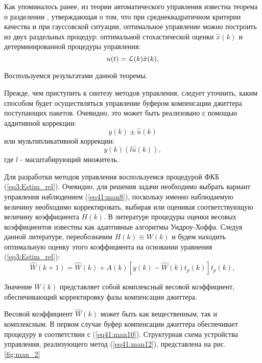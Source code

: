 Как упоминалось ранее, из теории автоматического управления известна теорема о разделении \cite{seij, red}, утверждающая о том, что при среднеквадратичном критерии качества и
при гауссовской ситуации, оптимальное управление можно построить из двух раздельных процедур: оптимальной стохастической оценки $\hat x (k)$  и детерминированной процедуры управления:
\begin{equation}\label{eq41:man9}
u(t)=\EuScript{L}(k)\hat x (k),
\end{equation}

Воспользуемся результатами данной теоремы.

Прежде, чем приступить к синтезу методов управления, следует уточнить, каким способом будет осуществляться управление буфером компенсации джиттера поступающих пакетов. 
Очевидно, это может быть реализовано с помощью аддитивной коррекции:
\begin{equation}\label{eq41:man10}
y(k)\pm\hat u(k)
\end{equation}
или мультипликативной коррекции:
\begin{equation}\label{eq41:man11}
y(k)(l\hat u(k)),
\end{equation}
\noindent где $l$ - масштабирующий множитель.

Для разработки методов управления воспользуемся процедурой ФКБ (\ref{eq3:Estim_rel}). Очевидно, для решения задачи необходимо выбрать вариант управления наблюдением (\ref{eq41:man8}),
поскольку именно наблюдаемую величину необходимо корректировать, выбирая или оценивая соответствующую величину коэффициента $H(k)$. 
В литературе \cite{windrow,monzigo} процедуры оценки весовых коэффициентов известны как адаптивные алгоритмы Уидроу-Хоффа. 
Следуя данной литературе, переобозначим $H(k)\equiv W(k)$ и будем находить оптимальную оценку этого коэффициента на основании уравнения (\ref{eq3:Estim_rel}):
\begin{equation}\label{eq41:man12}
\hat W(k+1)=\hat W(k)+A(k)[y(k)-\hat W(k)t_{p}(k)]t_{p}(k),
\end{equation}

Значение $W(k)$ представляет собой комплексный весовой коэффициент, обеспечивающий корректировку фазы компенсации джиттера.

Весовой коэффициент $\hat W(k)$ может быть как вещественным, так и комплексным. 
В первом случае буфер компенсации джиттера обеспечивает процедуру в соответствии с (\ref{eq41:man10}). 
Структурная схема устройства управления, реализующего метод (\ref{eq41:man12}), представлена на рис. \ref{fig:man_2}

